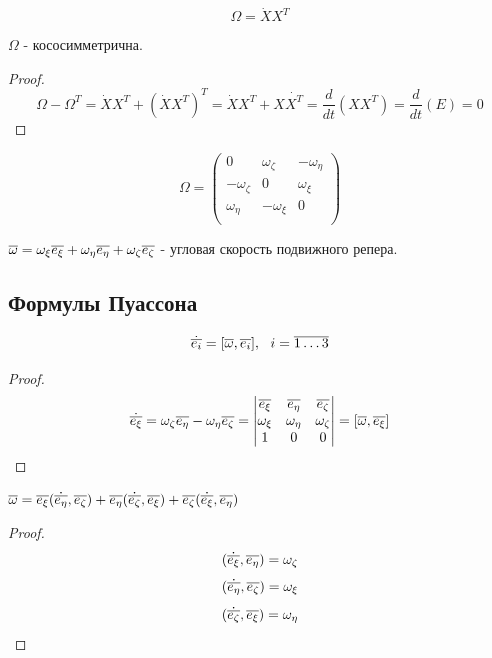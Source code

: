   $$ \Omega = \dot X X^T $$

  
  \begin{ass}
  $\Omega$ - кососимметрична.
  \end{ass}
  \begin{proof}
  $$ \Omega - \Omega^T = \dot X X^T + (\dot X X^T)^T = \dot X X^T + X \dot {X^T} = \frac{d}{dt}(XX^T) = 
  \frac{d}{dt}(E) = 0 $$
  \end{proof}
  
  \begin{cor}
  $$ \Omega =
  \left(
  \begin{matrix}
  0 & \omega_{\zeta} & -\omega_{\eta} \\
  -\omega_{\zeta} & 0 & \omega_{\xi} \\
  \omega_{\eta} & -\omega_{\xi} & 0 \\
  \end{matrix}
  \right)
  $$
  \end{cor}
  \begin{df}
  $ {\overline{\omega}} = \omega_{\xi}{\overline{e_{\xi}}} + \omega_{\eta}{\overline{e_{\eta}}} + \omega_{\zeta}{\overline{e_{\zeta}}} $ - угловая скорость подвижного репера.
  \end{df}
  
  \subsection{Формулы Пуассона}
  \begin{ass}
  $$ \dot{{\overline{e_i}}} = [{\overline{\omega}}, {\overline{e_i}}],~~ i = \overline{1 \ldots 3} $$
  \end{ass}
  \begin{proof}
  $$
  \dot{{\overline{e_{\xi}}}} = \omega_{\zeta} {\overline{e_{\eta}}} - \omega_{\eta} {\overline{e_{\zeta}}} =
  \begin{vmatrix}
  {\overline{e_{\xi}}} & {\overline{e_{\eta}}} & {\overline{e_{\zeta}}} \\
  \omega_{\xi} & \omega_{\eta} & \omega_{\zeta} \\
  1 & 0 & 0 \\ 
  \end{vmatrix}
  =
  [{\overline{\omega}}, {\overline{e_{\xi}}}] 
  $$
  \end{proof}
  
  \begin{ass}
  $ {\overline{\omega}} = {\overline{e_{\xi}}}(\dot{{\overline{e_{\eta}}}}, {\overline{e_{\zeta}}}) + {\overline{e_{\eta}}}(\dot{{\overline{e_{\zeta}}}}, {\overline{e_{\xi}}}) + {\overline{e_{\zeta}}}(\dot{{\overline{e_{\xi}}}}, {\overline{e_{\eta}}}) $
  \end{ass}
  \begin{proof}
  $$ (\dot{{\overline{e_{\xi}}}}, {\overline{e_{\eta}}}) = \omega_{\zeta} $$
  $$ (\dot{{\overline{e_{\eta}}}}, {\overline{e_{\zeta}}}) = \omega_{\xi} $$
  $$ (\dot{{\overline{e_{\zeta}}}}, {\overline{e_{\xi}}}) = \omega_{\eta} $$
  \end{proof}
  
